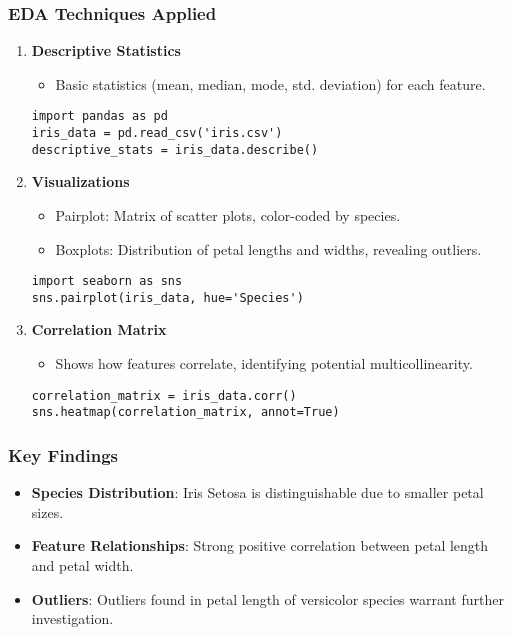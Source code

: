 \documentclass[aspectratio=169]{beamer}
\begin{document}
\begin{frame}[fragile]
    \frametitle{EDA Techniques Applied}
    \begin{enumerate}
        \item \textbf{Descriptive Statistics}
        \begin{itemize}
            \item Basic statistics (mean, median, mode, std. deviation) for each feature.
        \end{itemize}
        \begin{lstlisting}
import pandas as pd
iris_data = pd.read_csv('iris.csv')
descriptive_stats = iris_data.describe()
        \end{lstlisting}
        
        \item \textbf{Visualizations}
        \begin{itemize}
            \item Pairplot: Matrix of scatter plots, color-coded by species.
            \item Boxplots: Distribution of petal lengths and widths, revealing outliers.
        \end{itemize}
        \begin{lstlisting}
import seaborn as sns
sns.pairplot(iris_data, hue='Species')
        \end{lstlisting}

        \item \textbf{Correlation Matrix}
        \begin{itemize}
            \item Shows how features correlate, identifying potential multicollinearity.
        \end{itemize}
        \begin{lstlisting}
correlation_matrix = iris_data.corr()
sns.heatmap(correlation_matrix, annot=True)
        \end{lstlisting}
    \end{enumerate}
\end{frame}

\begin{frame}
    \frametitle{Key Findings}
    \begin{itemize}
        \item \textbf{Species Distribution}: Iris Setosa is distinguishable due to smaller petal sizes.
        \item \textbf{Feature Relationships}: Strong positive correlation between petal length and petal width.
        \item \textbf{Outliers}: Outliers found in petal length of versicolor species warrant further investigation.
    \end{itemize}
\end{frame}
\end{document}
